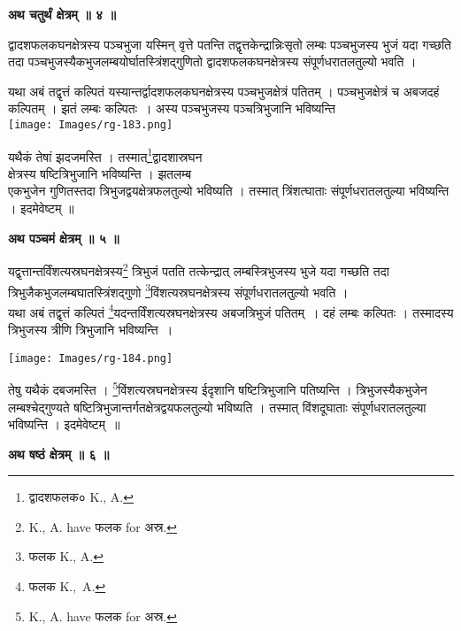 \documentclass[11pt, openany]{book}
\begin{document}
\begin{center}
\textbf{\large अथ चतुर्थं क्षेत्रम् ॥ ४ ॥ }
\end{center}
\vspace{5mm}

{\ab द्वादशफलकघनक्षेत्रस्य पञ्चभुजा यस्मिन् वृत्ते पतन्ति  तद्वृत्तकेन्द्रान्निःसृतो लम्बः पञ्चभुजस्य भुजं यदा गच्छति तदा पञ्चभुजस्यैकभुजलम्बयोर्घातस्त्रिंशद्गुणितो द्वादशफलकघनक्षेत्रस्य संपूर्णधरातलतुल्यो भवति ।}

\newpage
\begin{vwcol}[widths={0.7,0.3}, sep=.8cm, rule=0pt]
यथा अबं तद्वृत्तं कल्पितं यस्यान्तर्द्वादशफलकघनक्षेत्रस्य पञ्चभुजक्षेत्रं पतितम् । पञ्चभुजक्षेत्रं च अबजदहं कल्पितम् । झतं लम्बः कल्पितः~। अस्य पञ्चभुजस्य पञ्चत्रिभुजानि भविष्यन्ति\\
\noindent \texttt{[image: Images/rg-183.png]}  
\end{vwcol}
\vspace{-11mm}

\noindent यथैकं तेषां झदजमस्ति । तस्मात्\renewcommand{\thefootnote}{१}\footnote{द्वादशफलक० {\en K., A.} }द्वादशास्रघन\\
क्षेत्रस्य षष्टित्रिभुजानि भविष्यन्ति । झतलम्ब \\
एकभुजेन गुणितस्तदा त्रिभुजद्वयक्षेत्रफलतुल्यो भविष्यति । तस्मात् त्रिंशत्घाताः संपूर्णधरातलतुल्या भविष्यन्ति ।
इदमेवेष्टम् ॥\\
\begin{center}
\textbf{\large अथ पञ्चमं क्षेत्रम् ॥ ५ ॥ }
\end{center}
\vspace{2mm}

{\ab यद्वृत्तान्तर्विंशत्यस्रघनक्षेत्रस्य\renewcommand{\thefootnote}{२}\footnote{{\en K., A. have} फलक {\en for} अस्र.} त्रिभुजं पतति तत्केन्द्रात्  लम्बस्त्रिभुजस्य भुजे यदा गच्छति तदा त्रिभुजैकभुजलम्बघातस्त्रिंशद्गुणो \renewcommand{\thefootnote}{३}\footnote{फलक {\en K., A.} }विंशत्यस्रघनक्षेत्रस्य संपूर्णधरातलतुल्यो भवति ।}\\

यथा अबं तद्वृत्तं कल्पितं \renewcommand{\thefootnote}{४}\footnote{फलक {\en K.,~A.}}यदन्तर्विंशत्यस्रघनक्षेत्रस्य अबजत्रिभुजं पतितम्~। दहं लम्बः कल्पितः । तस्मादस्य त्रिभुजस्य त्रीणि त्रिभुजानि भविष्यन्ति~। 
\begin{center}
\texttt{[image: Images/rg-184.png]}  
\end{center}
तेषु यथैकं  दबजमस्ति । \renewcommand{\thefootnote}{५}\footnote{{\en K., A. have} फलक {\en for} अस्र.}विंशत्यस्रघनक्षेत्रस्य ईदृशानि षष्टित्रिभुजानि पतिष्यन्ति । त्रिभुजस्यैकभुजेन लम्बश्चेद्गुण्यते षष्टित्रिभुजान्तर्गतक्षेत्रद्वयफलतुल्यो भविष्यति । तस्मात् विंशदूघाताः संपूर्णधरातलतुल्या भविष्यन्ति । इदमेवेष्टम्~॥\\
\begin{center}
\textbf{\large अथ षष्ठं क्षेत्रम् ॥ ६ ॥ }
\end{center}
\vspace{2mm}
\end{document}
